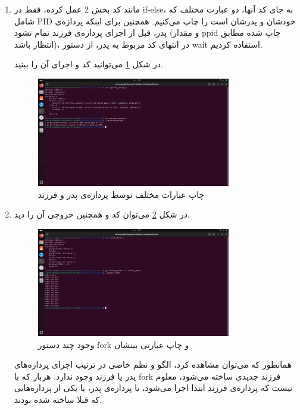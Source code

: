 \documentclass[12pt]{article}
\begin{document}
\begin{enumerate}
        \item 
        مانند کد بخش 2 عمل کرده، فقط در 
        \textenglish{if-else}،
        به جای کد آنها، دو عبارت 
        مختلف که شامل 
        \textenglish{PID}
        خودشان و پدرشان است را چاپ می‌کنیم. همچنین برای اینکه پردازه‌ی پدر، قبل از اجرای پردازه‌ی فرزند تمام نشود (و مقدار 
        \textenglish{ppid}
        چاپ شده مطابق انتظار باشد)، در انتهای کد مربوط به پدر، از دستور
        \textenglish{wait}
        استفاده کردیم.

        در شکل
        \ref{im7}
        می‌توانید کد و اجرای آن را ببنید.

        \begin{figure}[H]
		\centering
		\includegraphics[width=0.8\textwidth]{report4-resources/7.png}
		\caption{چاپ عبارات مختلف توسط پردازه‌ی پدر و فرزند}
            \label{im7}
	\end{figure}

        \item 
        در شکل
        \ref{im8}
        می‌توان کد و همچنین خروجی آن را دید.

        \begin{figure}[H]
		\centering
		\includegraphics[width=0.8\textwidth]{report4-resources/8.png}
		\caption{وجود چند دستور \textenglish{fork} و چاپ عبارتی بینشان}
            \label{im8}
	\end{figure}

        همانطور که می‌توان مشاهده کرد، الگو و نظم خاصی در ترتیب اجرای پردازه‌های پدر یا فرزند وجود ندارد. هربار که با 
        \textenglish{fork}
        فرزند جدیدی ساخته می‌شود، معلوم نیست که پردازه‌ی فرزند ابتدا اجرا می‌شود، یا پردازه‌ی پدر، یا یکی از پردازه‌هایی که قبلا ساخته شده بودند.
        \end{enumerate}
\end{document}
